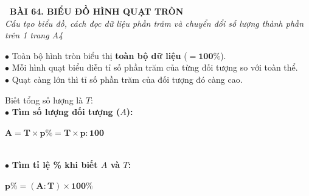 \documentclass[14pt,a4paper,oneside]{extbook}
\begin{document}
\noindent
\begin{tcolorbox}[
  enhanced,
  colback=teal!8!white,
  colframe=teal!80!black,
  arc=3mm,
  boxrule=1.1pt,
  width=\linewidth,
  halign=center,
  top=2.2mm, bottom=2.2mm,
  left=3mm, right=3mm,
  drop fuzzy shadow
]
  {\large\bfseries\color{teal!95!black}\faBookmark\ BÀI 64. BIỂU ĐỒ HÌNH QUẠT TRÒN}\\[2pt]
  {\scriptsize\color{black!75}\itshape Cấu tạo biểu đồ, cách đọc dữ liệu phần trăm và chuyển đổi số lượng thành phần trên 1 trang A4}
\end{tcolorbox}

\vspace{3.2mm}
\noindent
\begin{minipage}[t]{0.54\textwidth}
  \begin{tcolorbox}[
    enhanced,
    title={\footnotesize\bfseries\color{white}\faPieChart\ 1. Cấu tạo biểu đồ quạt tròn},
    colback=blue!2!white,
    colframe=blue!75!black,
    arc=2.5mm, boxrule=0.8pt, top=1.8mm, bottom=1.8mm, left=2.2mm, right=2.2mm
  ]
    \footnotesize
    $\bullet$ Toàn bộ hình tròn biểu thị \textbf{toàn bộ dữ liệu} ($= \mathbf{100\%}$).\\
    $\bullet$ Mỗi hình quạt biểu diễn tỉ số phần trăm của từng đối tượng so với toàn thể.\\
    $\bullet$ Quạt càng lớn thì tỉ số phần trăm của đối tượng đó càng cao.
  \end{tcolorbox}
\end{minipage}%
\hfill
\begin{minipage}[t]{0.44\textwidth}
  \begin{tcolorbox}[
    enhanced,
    title={\footnotesize\bfseries\color{white}\faCalculator\ 2. Công thức tính toán dữ liệu},
    colback=teal!2!white,
    colframe=teal!75!black,
    arc=2.5mm, boxrule=0.8pt, top=1.8mm, bottom=1.8mm, left=2mm, right=2mm
  ]
    \footnotesize
    Biết tổng số lượng là $T$:\\
    $\bullet$ \textbf{Tìm số lượng đối tượng ($A$):}\\
    \centerline{$\mathbf{A = T \times p\% = T \times p : 100}$}\\
    $\bullet$ \textbf{Tìm tỉ lệ \% khi biết $A$ và $T$:}\\
    \centerline{$\mathbf{p\% = (A : T) \times 100\%}$}
  \end{tcolorbox}
\end{minipage}

\vspace{3mm}
\end{document}
